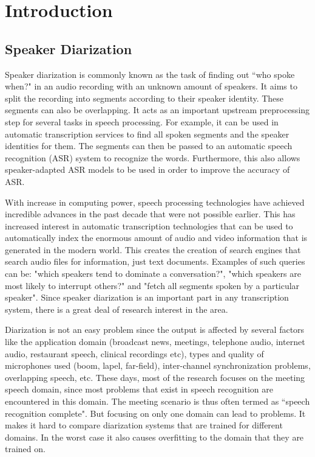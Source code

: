 \chapter{Introduction}

\section{Speaker Diarization}
Speaker diarization is commonly known as the task of finding out ``who spoke when?" in an audio recording with an unknown amount of speakers. It aims to split the recording into segments according to their speaker identity. These segments can also be overlapping. It acts as an important upstream preprocessing step for several tasks in speech processing. For example, it can be used in automatic transcription services to find all spoken segments and the speaker identities for them. The segments can then be passed to an automatic speech recognition (ASR) system to recognize the words. Furthermore, this also allows speaker-adapted ASR models to be used in order to improve the accuracy of ASR.

With increase in computing power, speech processing technologies have achieved incredible advances in the past decade that were not possible earlier. This has increased interest in automatic transcription technologies that can be used to automatically index the enormous amount of audio and video information that is generated in the modern world. This creates the creation of search engines that search audio files for information, just text documents. Examples of such queries can be: "which speakers tend to dominate a conversation?",  "which speakers are most likely to interrupt others?" and "fetch all segments spoken by a particular speaker". Since speaker diarization is an important part in any transcription system, there is a great deal of research interest in the area.

Diarization is not an easy problem since the output is affected by several factors like the application domain (broadcast news, meetings, telephone audio, internet audio, restaurant speech, clinical recordings etc), types and quality of microphones used (boom, lapel, far-field), inter-channel synchronization problems, overlapping speech, etc. These days, most of the research focuses on the meeting speech domain, since most problems that exist in speech recognition are encountered in this domain. The meeting scenario is thus often termed as ``speech recognition complete". But focusing on only one domain can lead to problems. It makes it hard to compare diarization systems that are trained for different domains. In the worst case it also causes overfitting to the domain that they are trained on.

